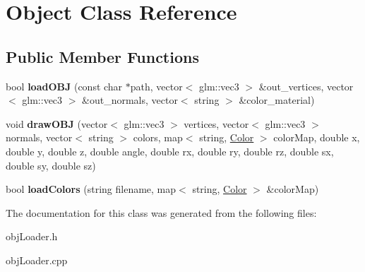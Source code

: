 \hypertarget{class_object}{}\section{Object Class Reference}
\label{class_object}
\subsection*{Public Member Functions}
\begin{DoxyCompactItemize}
\item 
bool {\bfseries load\+O\+BJ} (const char $\ast$path, vector$<$ glm\+::vec3 $>$ \&out\+\_\+vertices, vector$<$ glm\+::vec3 $>$ \&out\+\_\+normals, vector$<$ string $>$ \&color\+\_\+material)\hypertarget{class_object_a455ee637412ffcb4bbcb095a6308dcc1}{}\label{class_object_a455ee637412ffcb4bbcb095a6308dcc1}

\item 
void {\bfseries draw\+O\+BJ} (vector$<$ glm\+::vec3 $>$ vertices, vector$<$ glm\+::vec3 $>$ normals, vector$<$ string $>$ colors, map$<$ string, \hyperlink{struct_color}{Color} $>$ color\+Map, double x, double y, double z, double angle, double rx, double ry, double rz, double sx, double sy, double sz)\hypertarget{class_object_af8b0343b49b378fb950b832701126c0c}{}\label{class_object_af8b0343b49b378fb950b832701126c0c}

\item 
bool {\bfseries load\+Colors} (string filename, map$<$ string, \hyperlink{struct_color}{Color} $>$ \&color\+Map)\hypertarget{class_object_a5db215c7f93f5a253396fb95750ee93b}{}\label{class_object_a5db215c7f93f5a253396fb95750ee93b}

\end{DoxyCompactItemize}


The documentation for this class was generated from the following files\+:\begin{DoxyCompactItemize}
\item 
obj\+Loader.\+h\item 
obj\+Loader.\+cpp\end{DoxyCompactItemize}
